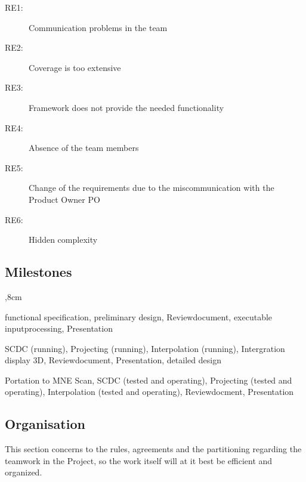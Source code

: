 \begin{description}
	\item[RE1:] Communication problems in the team
	\item[RE2:] Coverage is too extensive
	\item[RE3:] Framework does not provide the needed functionality 
	\item[RE4:] Absence of the team members 
	\item[RE5:] Change of the requirements due to the miscommunication with the Product Owner PO
	\item[RE6:] Hidden complexity 
 \end{description}

\clearpage

\subsection{Milestones}
\begin{description}
	,8cm
	\item[First Milestone:] functional specification, preliminary design, Reviewdocument, executable inputprocessing, Presentation 
	
	\item[Second Milestone:] SCDC (running), Projecting (running), Interpolation (running), Intergration display 3D, Reviewdocument, Presentation, detailed design
	
	\item[Third Milenstone:] Portation to MNE Scan, SCDC (tested and operating), Projecting (tested and operating), Interpolation (tested and operating), Reviewdocment, Presentation
\end{description}



\subsection{Organisation}

This section concerns to the rules, agreements and the partitioning regarding the teamwork in the Project, so the work itself will at it best be efficient and organized. 

